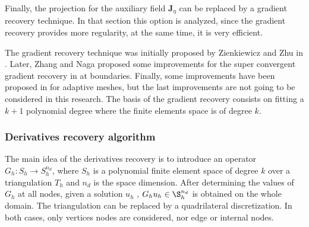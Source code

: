 Finally, the projection for the auxiliary field $\mathbf{J}_\eta$ can be replaced by a gradient recovery technique. In that section this option is analyzed, since the gradient recovery provides more regularity, at the same time, it is very efficient.

The gradient recovery technique was initially proposed by Zienkiewicz and Zhu in \cite{zienkiewicz1992}. Later, Zhang and Naga proposed some improvements for the super convergent gradient recovery in \cite{zhang2005} at boundaries. Finally, some improvements have been proposed in \cite{wu2007,ahmed2021} for adaptive meshes, but the last improvements are not going to be considered in this research. The basis of the gradient recovery consists on fitting a $k+1$ polynomial degree where the finite elements space is of degree $k$.


\subsubsection{Derivatives recovery algorithm}

The main idea of the derivatives recovery is to introduce an operator $G_h : S_h \rightarrow S_h^{n_d}$, where $S_h$ is a polynomial finite element space of degree $k$ over a triangulation $T_h$ and $n_d$ is the space dimension. After determining the values of $G_h$ at all nodes, given a solution $u_h$ , $G_h u_h \in \S_h^{n_d}$ is obtained on the whole domain.
The triangulation can be replaced by a quadrilateral discretization. In both cases, only vertices nodes are considered, nor edge or internal nodes.

